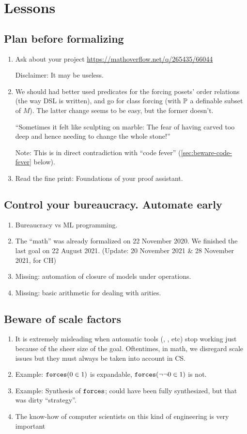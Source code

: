 \section{Lessons}\label{sec:lessons}

\subsection{Plan before formalizing}
\begin{enumerate}
\item Ask about your project
  \url{https://mathoverflow.net/q/265435/66044}

  Disclaimer: It may be useless.
\item We should had better used predicates for the forcing posets'
  order relations (the way DSL is written), and go for class forcing
  (with $\mathbb{P}$ a definable subset of $M$). The latter change seems to be
  easy, but the former doesn't.
  
  “Sometimes it felt like sculpting on marble: The fear of having
  carved too deep and hence needing to change the whole stone!”

  Note: This is in direct contradiction with “code fever”
  (\ref{sec:beware-code-fever} below).
\item Read the fine print: Foundations of your proof assistant.
\end{enumerate}

\subsection{Control your bureaucracy. Automate early}
\begin{enumerate}
\item Bureaucracy vs ML programming.
\item The “math” was already formalized on 22 November 2020.
  We finished the last goal on 22 August 2021.
  (Update: 20 November 2021 \& 28 November 2021, for CH)
\item Missing: automation of closure of models under operations.
\item Missing: basic arithmetic for dealing with arities.
\end{enumerate}

\subsection{Beware of scale factors}
\begin{enumerate}
\item It is extremely misleading when automatic tools (, , etc)
  stop working just because of the sheer size of the goal. Oftentimes,
  in math, we disregard scale issues but they must always be taken
  into account in CS.
\item Example: $\mathop{\mathtt{forces}}(0\in 1)$ is expandable,
  $\mathop{\mathtt{forces}}(\neg\neg  0\in 1)$ is not.
\item Example: Synthesis of $\mathop{\mathtt{forces}}$; could have been fully synthesized,
  but that was dirty “strategy”.
\item The know-how of computer scientists on this kind of engineering is
  very important
\end{enumerate}

